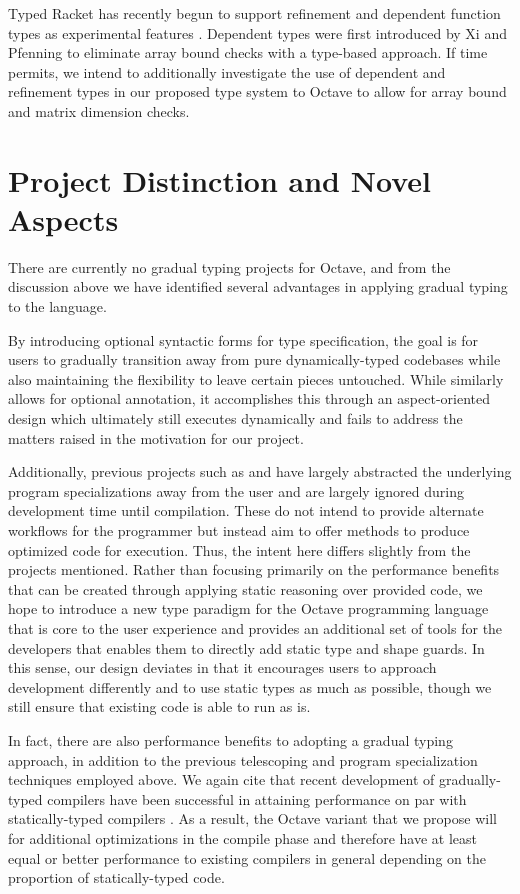 Typed Racket has recently begun to support refinement and dependent function types as experimental features \cite{kent2017refinement}. Dependent types were first introduced by Xi and Pfenning \cite{xi1998eliminating} to eliminate array bound checks with a type-based approach. If time permits, we intend to additionally investigate the use of dependent and refinement types in our proposed type system to Octave to allow for array bound and matrix dimension checks.


\section{Project Distinction and Novel Aspects}
There are currently no gradual typing projects for Octave, and from the discussion above we have identified several advantages in applying gradual typing to the language.

By introducing optional syntactic forms for type specification, the goal is for users to gradually transition away from pure dynamically-typed codebases while also maintaining the flexibility to leave certain pieces untouched. While \citet{hendren2011typing} similarly allows for optional annotation, it accomplishes this through an aspect-oriented design which ultimately still executes dynamically and fails to address the matters raised in the motivation for our project.

Additionally, previous projects such as \citet{chauhan2003type} and \citet{olmos2003turning} have largely abstracted the underlying program specializations away from the user and are largely ignored during development time until compilation. These do not intend to provide alternate workflows for the programmer but instead aim to offer methods to produce optimized code for execution. Thus, the intent here differs slightly from the projects mentioned. Rather than focusing primarily on the performance benefits that can be created through applying static reasoning over provided code, we hope to introduce a new type paradigm for the Octave programming language that is core to the user experience and provides an additional set of tools for the developers that enables them to directly add static type and shape guards. In this sense, our design deviates in that it encourages users to approach development differently and to use static types as much as possible, though we still ensure that existing code is able to run as is.

In fact, there are also performance benefits to adopting a gradual typing approach, in addition to the previous telescoping and program specialization techniques employed above. We again cite that recent development of gradually-typed compilers have been successful in attaining performance on par with statically-typed compilers \cite{kuhlenschmidt2018efficient}. As a result, the Octave variant that we propose will for additional optimizations in the compile phase and therefore have at least equal or better performance to existing compilers in general depending on the proportion of statically-typed code.

